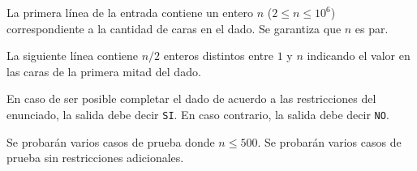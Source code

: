 \documentclass{oci}
\begin{document}
\begin{inputDescription}
  La primera línea de la entrada contiene un entero $n$ ($2 \leq n \leq 10^6$)
  correspondiente a la cantidad de caras en el dado.
  Se garantiza que $n$ es par.

  La siguiente línea contiene $n/2$ enteros distintos entre $1$ y $n$ indicando
  el valor en las caras de la primera mitad del dado.
\end{inputDescription}

\begin{outputDescription}
  En caso de ser posible completar el dado de acuerdo a las restricciones del enunciado,
  la salida debe decir \texttt{SI}. En caso contrario, la salida debe decir \texttt{NO}.
\end{outputDescription}

\begin{scoreDescription}
   Se probarán varios casos de prueba donde $n \leq 500$.
   Se probarán varios casos de prueba sin restricciones adicionales.
\end{scoreDescription}

\begin{sampleDescription}
\end{sampleDescription}
\end{document}
